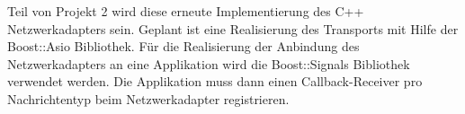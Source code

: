 Teil von Projekt 2 wird diese erneute Implementierung des C++ Netzwerkadapters sein. Geplant ist eine Realisierung des Transports mit Hilfe der Boost::Asio Bibliothek. Für die Realisierung der Anbindung des Netzwerkadapters an eine Applikation wird die Boost::Signals Bibliothek verwendet werden. Die Applikation muss dann einen Callback-Receiver pro Nachrichtentyp beim Netzwerkadapter registrieren.\\


